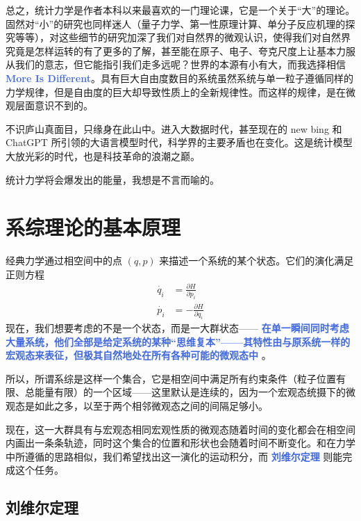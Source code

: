 \documentclass[hyperref,UTF-8]{ctexart}
\newcommand{\0}{\boldsymbol{0}}
\begin{document}
总之，统计力学是作者本科以来最喜欢的一门理论课，它是一个关于“大”的理论。固然对“小”的研究也同样迷人（量子力学、第一性原理计算、单分子反应机理的探究等等），对这些细节的研究加深了我们对自然界的微观认识，使得我们对自然界究竟是怎样运转的有了更多的了解，甚至能在原子、电子、夸克尺度上让基本力服从我们的意志，但它能指引我们走多远呢？世界的本源有小有大，而我选择相信 \textcolor{RoyalBlue}{\textbf{\kaishu More Is Different}}。具有巨大自由度数目的系统虽然系统与单一粒子遵循同样的力学规律，但是自由度的巨大却导致性质上的全新规律性。而这样的规律，是在微观层面意识不到的。

不识庐山真面目，只缘身在此山中。进入大数据时代，甚至现在的 new bing 和 ChatGPT 所引领的大语言模型时代，科学界的主要矛盾也在变化。这是统计模型大放光彩的时代，也是科技革命的浪潮之巅。

统计力学将会爆发出的能量，我想是不言而喻的。

\pagebreak 


\section{系综理论的基本原理}

经典力学通过相空间中的点 $(q,p)$ 来描述一个系统的某个状态。它们的演化满足正则方程
\begin{align*}
    \dot{q_i} &= \frac{\partial H}{\partial p_i} \\
    \dot{p_i} &= -\frac{\partial H}{\partial q_i}
\end{align*}
现在，我们想要考虑的不是一个状态，而是一大群状态——  \textcolor{RoyalBlue}{\textbf{\kaishu 在单一瞬间同时考虑大量系统，他们全部是给定系统的某种“思维复本”——其特性由与原系统一样的宏观态来表征，但极其自然地处在所有各种可能的微观态中}} \cite{Pathria}。

所以，所谓系综是这样一个集合，它是相空间中满足所有约束条件（粒子位置有限、总能量有限）的一个区域——这里默认是连续的，因为一个宏观态统摄下的微观态是如此之多，以至于两个相邻微观态之间的间隔足够小。

现在，这一大群具有与宏观态相同宏观性质的微观态随着时间的变化都会在相空间内画出一条条轨迹，同时这个集合的位置和形状也会随着时间不断变化。和在力学中所遵循的思路相似，我们希望找出这一演化的运动积分，而 \textcolor{RoyalBlue}{\textbf{\kaishu 刘维尔定理}} 则能完成这个任务。

\subsection{刘维尔定理}
\end{document}
